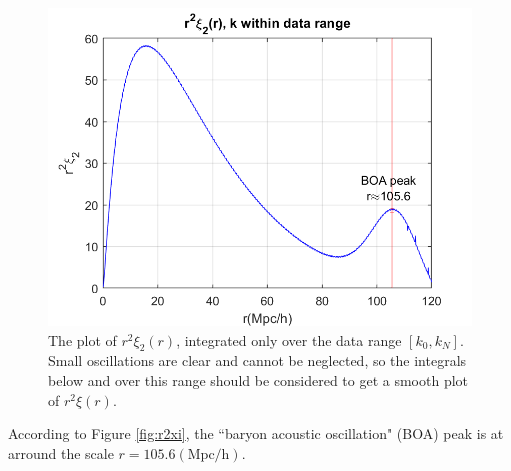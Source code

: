 \documentclass[12pt, graphicx]{article}
\begin{document}
\begin{figure}[ht]
\centering
\includegraphics[width = 140mm]{r2xi2_r_detailed.png}
\caption{The plot of $r^2\xi_2(r)$, integrated only over the data range $[k_0,k_N]$. Small oscillations are clear and cannot be neglected, so the integrals below and over this range should be considered to get a smooth plot of $r^2\xi(r)$.}
\label{fig:r2xi2}
\end{figure}

According to Figure \ref{fig:r2xi}, the \textquotedblleft baryon acoustic oscillation" (BOA) peak is at arround the scale  $r=105.6\mathrm{(Mpc/h)}$.
\end{document}
